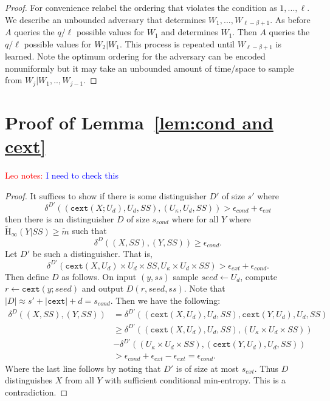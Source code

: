 \documentclass[11pt]{article}
\newcommand{\lemref}[1]{\mbox{Lemma~\ref{#1}}}
\newcommand{\Hav}{\tilde{\mathrm{H}}_\infty}
\newcommand{\cext}{\ensuremath{\mathtt{cext}}}
\newcommand{\authnote}[2]{{\textcolor{red}{\textsf{#1 notes: }\textcolor{blue}{ #2}}\marginpar{\textcolor{red}{\textbf{!!!!!}}}}}
\newcommand{\authnote}[2]{}
\newcommand{\lnote}[1]{{\authnote{Leo}{#1}}}
\begin{document}
\begin{proof}
For convenience relabel the ordering that violates the condition as $1,..., \ell$.  We describe an unbounded adversary that determines $W_1,..., W_{\ell-\beta+1}$.  As before $A$ queries the $q /\ell$ possible values for $W_1$ and determines $W_1$.  Then $A$ queries the $q/\ell$ possible values for $W_2 | W_1$.  This process is repeated until $W_{\ell-\beta+1}$ is learned.  Note the optimum ordering for the adversary can be encoded nonuniformly but it may take an unbounded amount of time/space to sample from $W_j | W_1,.., W_{j-1}$.
\end{proof}

\section{Proof of \lemref{lem:cond and cext}}
\label{sec:cond and cext}
\lnote{I need to check this}
\begin{proof}
It suffices to show if there is some distinguisher $D'$ of size $s'$ where
\[\delta^{D'}((\cext(X; U_d), U_d, SS), (U_\kappa, U_d, SS))>\epsilon_{cond}+ \epsilon_{ext}\]
 then there is an distinguisher $D$ of size $s_{cond}$ where for all $Y$ where $\Hav(Y|SS) \geq \tilde{m}$ such that
 \[
 \delta^{D}((X, SS), (Y, SS))\geq \epsilon_{cond}.
 \]
Let $D'$ be such a distinguisher.  That is,
\[
\delta^{D'}(\cext(X, U_d)\times U_d \times SS, U_\kappa\times U_d\times SS)> \epsilon_{ext}+\epsilon_{cond}.
\]
Then define $D$ as follows.  On input $(y, ss)$ sample $seed\leftarrow U_d$, compute $r\leftarrow \cext(y; seed)$ and output $D(r, seed, ss)$.  Note that $|D| \approx s' + |\cext| +d= s_{cond}$.  Then we have the following:
\begin{align*}
\delta^{D}((X, SS), (Y, SS))&= \delta^{D'}((\cext(X, U_d), U_d, SS), \cext(Y, U_d), U_d, SS)\\
&\geq \delta^{D'}((\cext(X, U_d), U_d, SS), (U_\kappa\times U_d \times SS)) \\
&- \delta^{D'}((U_\kappa\times U_d \times SS), (\cext(Y, U_d), U_d, SS))\\
&>\epsilon_{cond}+\epsilon_{ext}- \epsilon_{ext} = \epsilon_{cond}.
\end{align*}
Where the last line follows by noting that $D'$ is of size at most $s_{ext}$.  Thus $D$ distinguishes $X$ from all $Y$ with sufficient conditional min-entropy.  This is a contradiction.
\end{proof}
\end{document}
